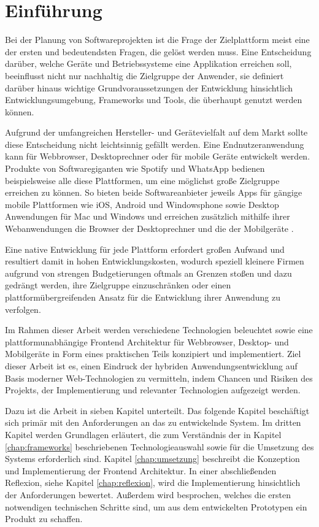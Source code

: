 
\chapter{Einführung}
\label{chap:introduction}

Bei der Planung von Softwareprojekten ist die Frage der Zielplattform meist eine der ersten und bedeutendsten Fragen,
die gelöst werden muss. Eine Entscheidung darüber, welche Geräte und Betriebssysteme eine Applikation erreichen soll,
beeinflusst nicht nur nachhaltig die Zielgruppe der Anwender, sie definiert darüber hinaus wichtige Grundvoraussetzungen der Entwicklung hinsichtlich Entwicklungsumgebung, Frameworks und Tools, die überhaupt genutzt werden können.

Aufgrund der umfangreichen Hersteller- und Gerätevielfalt auf dem Markt sollte diese Entscheidung nicht leichtsinnig gefällt werden.
Eine Endnutzeranwendung kann für Webbrowser, Desktoprechner oder für mobile Geräte entwickelt werden.
Produkte von Softwaregiganten wie Spotify und WhatsApp bedienen beispielsweise alle diese Plattformen, um eine möglichst große Zielgruppe erreichen zu können.
So bieten beide Softwareanbieter jeweils Apps für gängige mobile Plattformen wie iOS, Android und Windowsphone
sowie Desktop Anwendungen für Mac und Windows und erreichen zusätzlich mithilfe ihrer Webanwendungen die Browser der Desktoprechner
und die der Mobilgeräte \cite{Spoti93:online} \cite{Whats74:online} \cite{Whats6:online}.

Eine native Entwicklung für jede Plattform erfordert großen Aufwand und resultiert damit in hohen
Entwicklungskosten, wodurch speziell kleinere Firmen aufgrund von strengen Budgetierungen oftmals
an Grenzen stoßen und
dazu gedrängt werden, ihre Zielgruppe einzuschränken oder einen plattformübergreifenden Ansatz für
die Entwicklung ihrer Anwendung zu verfolgen.

Im Rahmen dieser Arbeit werden verschiedene Technologien beleuchtet sowie eine
plattformunabhängige Frontend Architektur für Webbrowser, Desktop- und Mobilgeräte in Form eines praktischen Teils
konzipiert und implementiert.
Ziel dieser Arbeit ist es, einen Eindruck der hybriden Anwendungsentwicklung auf Basis moderner
Web-Technologien zu vermitteln, indem Chancen und Risiken des Projekts, der Implementierung und relevanter Technologien aufgezeigt werden.

\vspace{0.6cm}

\noindent
Dazu ist die Arbeit in sieben Kapitel unterteilt. Das folgende Kapitel beschäftigt sich primär mit den
Anforderungen an das zu entwickelnde System.
Im dritten Kapitel werden Grundlagen erläutert, die zum Verständnis der in Kapitel \ref{chap:frameworks} beschriebenen Technologieauswahl
sowie für die Umsetzung des Systems erforderlich sind.
Kapitel \ref{chap:umsetzung} beschreibt die Konzeption und Implementierung der Frontend Architektur.
In einer abschließenden Reflexion, siehe Kapitel \ref{chap:reflexion}, wird die Implementierung hinsichtlich der Anforderungen bewertet.
Außerdem wird besprochen, welches die ersten notwendigen technischen Schritte sind, um aus dem entwickelten Prototypen ein Produkt zu schaffen.
